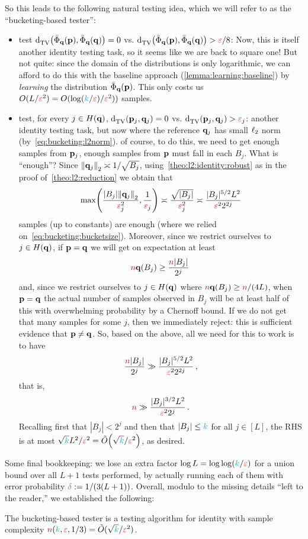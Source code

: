 \noindent So this leads to the following natural testing idea, which we will refer to as the ``bucketing-based tester'':
 \begin{itemize}
 	\item test $\totalvardist{\bar{\Phi}_\q(\p)}{\bar{\Phi}_\q(\q)} = 0$ vs. $\totalvardist{\bar{\Phi}_\q(\p)}{\bar{\Phi}_\q(\q)}>\dst/8$: Now, this is itself another identity testing task, so it seems like we are back to square one! But not quite: since the domain of the distributions is only logarithmic, we can afford to do this with the baseline approach (\cref{lemma:learning:baseline}) by \emph{learning} the distribution $\bar{\Phi}_\q(\p)$. This only costs us $O(L/\dst^2) = O(\log(\ab/\dst)/\dst^2))$ samples.
 	\item test, for every $j\in H(\q)$, $\totalvardist{\p_j}{\q_j} = 0$ vs. $\totalvardist{\p_j}{\q_j}>\dst_j$: another identity testing task, but now where the reference $\q_j$ has small $\lp[2]$ norm (by~\cref{eq:bucketing:l2norm}). of course, to do this, we need to get enough samples from $\p_j$, \ie enough samples from $\p$ must fall in each $B_j$. What is ``enough''? Since $\normtwo{\q_j}\asymp 1/\sqrt{B_j}$, using~\cref{theo:l2:identity:robust} as in the proof of~\cref{theo:l2:reduction} we obtain that
 	\[
 			\max\Paren{\frac{|B_j|\normtwo{\q_j}}{\dst_j^2}, \frac{1}{\dst_j}} \asymp \frac{\sqrt{|B_j|}}{\dst_j^2} \asymp \frac{|B_j|^{5/2}L^2}{\dst^22^{2j}}
 	\]
 	samples (up to constants) are enough (where we relied on~\cref{eq:bucketing:bucketsize}). Moreover, since we restrict ourselves to $j\in H(\q)$, if $\p=\q$ we will get on expectation at least
 	\[
 		\ns\q(B_j) \geq \frac{\ns|B_j|}{2^j}\;
 	\]
 	and, since we restrict ourselves to $j\in H(\q)$ where $\ns\q(B_j)\geq \ns/(4L)$, when $\p=\q$ the actual number of samples observed in $B_j$ will be at least half of this with overwhelming probability by a Chernoff bound. If we do not get that many samples for some $j$, then we immediately reject: this is sufficient evidence that $\p\neq \q$. So, based on the above, all we need for this to work is to have
 	\[
 		\frac{\ns|B_j|}{2^j} \gg \frac{|B_j|^{5/2}L^2}{\dst^22^{2j}}\,,
 	\]
 	that is,
 	\[
 		\ns \gg \frac{|B_j|^{3/2}L^2}{\dst^22^j}\,.
 	\]
 	Recalling first that $|B_j|<2^j$ and then that $|B_j|\leq \ab$ for all $j\in[L]$, the RHS is at most $\sqrt{\ab}L^2/\dst^2 = \tildeO{\sqrt{\ab}/\dst^2}$, as desired.
 \end{itemize}
Some final bookkeeping: we lose an extra factor $\log L = \log\log(\ab/\dst)$ for a union bound over all $L+1$ tests performed, by actually running each of them with error probability $\errprob \eqdef 1/(3(L+1))$. Overall, modulo to the missing details ``left to the reader,'' we established the following:
\begin{theorem}
  \label{theo:bucketing}
The bucketing-based tester is a testing algorithm for identity with sample complexity $\ns(\ab,\dst,1/3) = \tilde{O}(\sqrt{\ab}/\dst^2)$.
\end{theorem}

